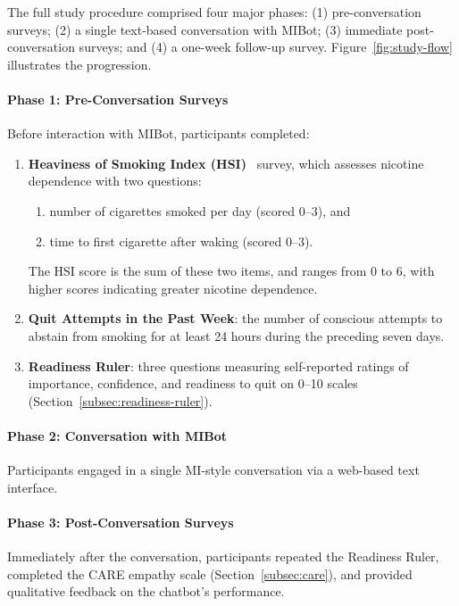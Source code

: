 The full study procedure comprised four major phases: (1) pre-conversation surveys; (2) a single text-based conversation with MIBot; (3) immediate post-conversation surveys; and (4) a one-week follow-up survey. Figure~\ref{fig:study-flow} illustrates the progression.

\paragraph{Phase 1: Pre-Conversation Surveys}
Before interaction with MIBot, participants completed:
\begin{enumerate}
    \item \textbf{Heaviness of Smoking Index (HSI)}~\citep{heatherton1989measuring} survey, which assesses nicotine dependence with two questions:
        \begin{enumerate}
            \item number of cigarettes smoked per day (scored 0--3), and
            \item time to first cigarette after waking (scored 0--3).
        \end{enumerate}
    The HSI score is the sum of these two items, and ranges from 0 to 6, with higher scores indicating greater nicotine dependence.
    \item \textbf{Quit Attempts in the Past Week}: the number of conscious attempts to abstain from smoking for at least 24 hours during the preceding seven days.
    \item \textbf{Readiness Ruler}: three questions measuring self-reported ratings of importance, confidence, and readiness to quit on 0--10 scales (Section~\ref{subsec:readiness-ruler}).
\end{enumerate}

\paragraph{Phase 2: Conversation with MIBot}
Participants engaged in a single MI-style conversation via a web-based text interface.

\paragraph{Phase 3: Post-Conversation Surveys}
Immediately after the conversation, participants repeated the Readiness Ruler, completed the CARE empathy scale (Section~\ref{subsec:care}), and provided qualitative feedback on the chatbot's performance.

